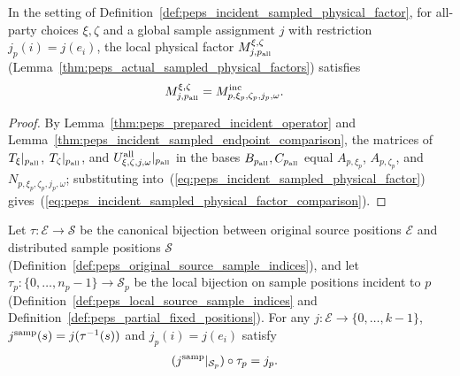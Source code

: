 \begin{lemma}
    \label{thm:peps_incident_sampled_physical_factor_comparison}
    \leanok
    In the setting of Definition~\ref{def:peps_incident_sampled_physical_factor},
    for all-party choices $\xi,\zeta$ and a global sample assignment $j$ with
    restriction $j_p(i)=j(e_i)$, the local physical factor
    $M^{\xi,\zeta}_{j,p_{\rm all}}$
    (Lemma~\ref{thm:peps_actual_sampled_physical_factors}) satisfies
    \begin{align}
        M^{\xi,\zeta}_{j,p_{\rm all}}
         & =M^{\rm inc}_{p,\xi_p,\zeta_p,j_p,\omega}.
        \label{eq:peps_incident_sampled_physical_factor_comparison}
    \end{align}
\end{lemma}

\begin{proof}
    \leanok
    By Lemma~\ref{thm:peps_prepared_incident_operator} and
    Lemma~\ref{thm:peps_incident_sampled_endpoint_comparison}, the matrices of
    $T_\xi|_{p_{\rm all}}$, $T_\zeta|_{p_{\rm all}}$, and
    $U^{\rm all}_{\xi,\zeta,j,\omega}|_{p_{\rm all}}$ in the bases $B_{p_{\rm all}},C_{p_{\rm all}}$
    equal $A_{p,\xi_p}$, $A_{p,\zeta_p}$, and $N_{p,\xi_p,\zeta_p,j_p,\omega}$;
    substituting into~(\ref{eq:peps_incident_sampled_physical_factor}) gives~(\ref{eq:peps_incident_sampled_physical_factor_comparison}).
\end{proof}


\begin{lemma}
    \label{thm:peps_incident_source_sample_compatibility}
    \leanok
    Let $\tau:\mathcal E\to\mathcal S$ be the canonical bijection between original
    source positions $\mathcal E$ and distributed sample positions $\mathcal S$
    (Definition~\ref{def:peps_original_source_sample_indices}), and let
    $\tau_p:\{0,\ldots,n_p-1\}\to\mathcal S_p$ be the local bijection on sample
    positions incident to $p$ (Definition~\ref{def:peps_local_source_sample_indices}
    and Definition~\ref{def:peps_partial_fixed_positions}). For any
    $j:\mathcal E\to\{0,\ldots,k-1\}$, $j^{\rm samp}(s)=j(\tau^{-1}(s))$ and
    $j_p(i)=j(e_i)$ satisfy
    \begin{align}
        (j^{\rm samp}|_{\mathcal S_p})\circ\tau_p & =j_p.
        \label{eq:peps_incident_source_sample_compatibility}
    \end{align}
\end{lemma}

